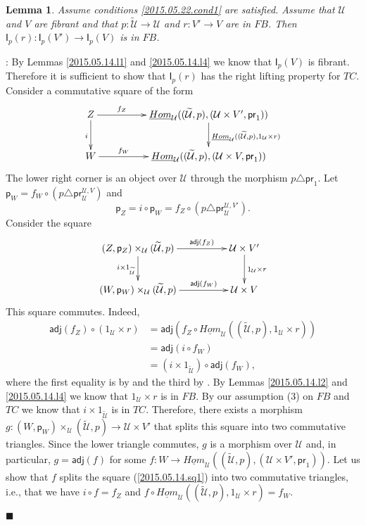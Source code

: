 \documentclass[12pt]{article}
\numberwithin{equation}{section}
\newenvironment{eq}{\begin{equation}}{\end{equation}}
\newenvironment{myproof}{{\bf Proof}:}{$\blacksquare$ \vskip 5mm }
\newtheorem{lemma}[proposition]{Lemma}
\newcommand{\sr}{\rightarrow}
\newcommand{\uu}{\underline}
\newcommand{\iHom}{\uu{Hom}}
\newcommand{\wt}{\widetilde}
\newcommand{\id}{1}            %
\newcommand{\p}{\mathsf{p}}
\newcommand{\U}{\mathcal{U}}
\newcommand{\I}{\mathsf{I}}
\newcommand{\pr}{\mathsf{pr}}
\newcommand{\adj}{\mathsf{adj}}
\begin{document}
%
\begin{lemma}
  \label{2015.05.14.l3}
  Assume conditions \ref{2015.05.22.cond1} are satisfied.
  Assume that $\U$ and $V$ are fibrant and that $p:\wt{\U}\sr \U$
  and $r:V'\sr V$ are in $FB$. Then $\I_p(r):\I_p(V')\sr \I_p(V)$ is in $FB$.
\end{lemma}
%
\begin{myproof}
By Lemmas \ref{2015.05.14.l1} and \ref{2015.05.14.l4} we know that $\I_p(V)$ is
fibrant. Therefore it is sufficient to show that $\I_p(r)$ has the right lifting
property for $TC$. Consider a commutative square of the form
%
\begin{eq}
\label{2015.05.14.sq1}
\begin{xy}
          \xymatrix@C=4pc{ Z \ar[r]^-{f_Z} \ar[d]_{i} &
            \iHom_\U((\wt{\U},p),(\U\times V',\pr_1))
            \ar[d]^{\iHom_\U((\wt{\U},p), \id_\U\times r)}\\ W \ar[r]^-{f_W} &
            \iHom_\U((\wt{\U},p), (\U\times V, \pr_1)) }
\end{xy}
\end{eq}%
%
The lower right corner is an object over $\U$ through the morphism $p\triangle
\pr_1$. Let $\p_W=f_W\circ (p\triangle \pr^{\U,V}_\U)$ and
%
\[ \p_Z=i\circ \p_W=f_Z\circ (p\triangle \pr^{\U,V'}_\U) . \]
%
Consider the square
%
\begin{eq}
\label{2015.05.14.sq2}
\begin{xy}
          \xymatrix@C=4pc{ (Z,\p_Z)\times_\U (\wt{\U},p) \ar[r]^-{\adj(f_Z)}
            \ar[d]_{i\times \id_{\wt{\U}}} & \U\times V' \ar[d]^{\id_\U\times
              r}\\ (W,\p_W)\times_\U (\wt{\U},p) \ar[r]^-{\adj(f_W)} & \U\times V }
\end{xy}
\end{eq}%
%
This square commutes. Indeed,
%
\begin{align*}
  \adj(f_Z)\circ (\id_\U\times r )
  & = \adj(f_Z\circ \iHom_\U((\wt{\U},p), \id_\U\times r)) \\
  & = \adj(i\circ f_W) \\
  & = (i\times \id_{\wt{\U}})\circ \adj (f_W),
\end{align*}
%
where the first equality is by \cite[Lemma 8.7(1)]{fromunivwithPi} and the
third by \cite[Lemma 8.7(3)]{fromunivwithPi}. By Lemmas \ref{2015.05.14.l2} and
\ref{2015.05.14.l4} we know that $\id_\U\times r$ is in $FB$. By our assumption
(3) on $FB$ and $TC$ we know that $i\times \id_{\wt{\U}}$ is in $TC$. Therefore,
there exists a morphism $g:(W,\p_W)\times_\U (\wt{\U},p) \sr \U\times V'$ that
splits this square into two commutative triangles. Since the lower triangle
commutes, $g$ is a morphism over $\U$ and, in particular, $g=\adj(f)$ for some
$f:W\sr \iHom_\U((\wt{\U},p),(\U\times V',\pr_1))$. Let us show that $f$ splits
the square (\ref{2015.05.14.sq1}) into two commutative triangles, i.e., that we
have $i\circ f= f_Z$ and $f\circ \iHom_\U((\wt{\U},p), \id_\U\times r)=f_W$.


\end{myproof}
\end{document}
